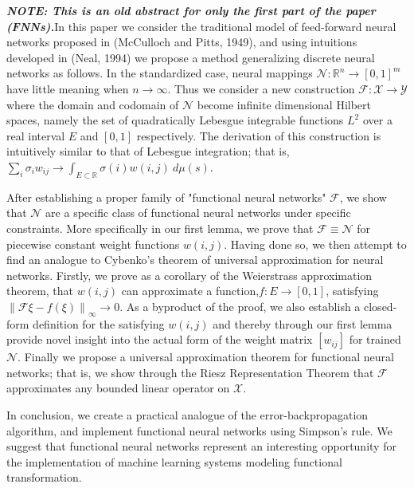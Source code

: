 \textit{\textbf{NOTE: This is an old abstract for only the first part of the paper (FNNs).}}In this paper we consider the traditional model of feed-forward neural networks proposed in (McCulloch and Pitts, 1949), and using intuitions developed in (Neal, 1994) we propose a method generalizing discrete neural networks as follows. In the standardized case, neural mappings $\mathcal{N}: \mathbb{R}^n \to [0,1]^m$ have little meaning when $n \to \infty$. Thus we consider a new construction $\mathcal{F}: \mathcal{X} \to \mathcal{Y}$ where the domain and codomain of $\mathcal{N}$ become infinite dimensional Hilbert spaces, namely the set of quadratically Lebesgue integrable functions $L^2$ over a real interval $E$ and $[0,1]$ respectively. The derivation of this construction is intuitively similar to that of Lebesgue integration; that is, $\sum_i \sigma_i w_{ij} \to \int_{E\subset\mathbb{R}}\sigma(i)w(i,j)\ d\mu(s)$. 

After establishing a proper family of "functional neural networks" $\mathcal{F}$, we show that $\mathcal{N}$ are a specific class of functional neural networks under specific constraints. More specifically in our first lemma, we prove that $\mathcal{F} \equiv \mathcal{N}$ for piecewise constant weight functions $w(i,j)$. Having done so, we then attempt to find an analogue to Cybenko's theorem of universal approximation for neural networks. Firstly, we prove as a corollary of the Weierstrass approximation theorem, that $w(i,j)$ can approximate a function,$f:E\to[0,1]$, satisfying $\left\|\mathcal{F}\xi - f(\xi)\right\|_\infty \to 0$. As a byproduct of the proof, we also establish a closed-form definition for the satisfying $w(i,j)$ and thereby through our first lemma provide novel insight into the actual form of the weight matrix $[w_{ij}]$ for trained $\mathcal{N}$. Finally we propose a universal approximation theorem for functional neural networks; that is, we show through the Riesz Representation Theorem that $\mathcal{F}$ approximates any bounded linear operator on $\mathcal{X}$.

In conclusion, we create a practical analogue of the error-backpropagation algorithm, and implement functional neural networks using Simpson’s rule. We suggest that functional neural networks represent an interesting opportunity for the implementation of machine learning systems modeling functional transformation.